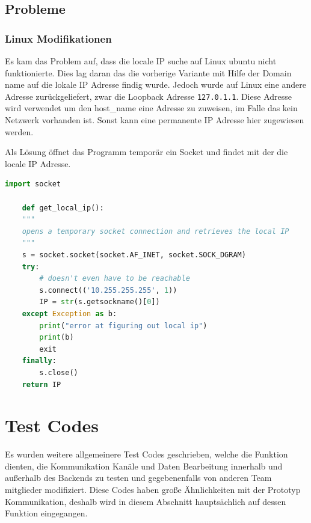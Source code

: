 \subsection{Probleme}
\subsubsection{Linux Modifikationen}
Es kam das Problem auf, dass die locale IP suche auf Linux ubuntu nicht funktionierte.
Dies lag daran das die vorherige Variante 
mit Hilfe der Domain name auf die lokale IP Adresse findig wurde.
Jedoch wurde auf Linux eine andere Adresse zurückgeliefert, 
zwar die Loopback Adresse \texttt{127.0.1.1}. 
Diese Adresse wird verwendet um den host\_name eine Adresse zu zuweisen,
im Falle das kein Netzwerk vorhanden ist. 
Sonst kann eine permanente IP Adresse hier zugewiesen werden.

Als Lösung öffnet das Programm temporär ein Socket und findet mit der die locale IP Adresse.
\begin{lstlisting}[language=python, gobble=4]
    import socket

    def get_local_ip():
    """
    opens a temporary socket connection and retrieves the local IP
    """
    s = socket.socket(socket.AF_INET, socket.SOCK_DGRAM)
    try:
        # doesn't even have to be reachable
        s.connect(('10.255.255.255', 1))
        IP = str(s.getsockname()[0])
    except Exception as b:
        print("error at figuring out local ip")
        print(b)
        exit
    finally:
        s.close()
    return IP
\end{lstlisting}

\section{Test Codes}
Es wurden weitere allgemeinere Test Codes geschrieben, 
welche die Funktion dienten, die Kommunikation Kanäle und Daten Bearbeitung innerhalb 
und außerhalb des Backends zu testen und gegebenenfalls von anderen Team mitglieder modifiziert.
Diese Codes haben große Ähnlichkeiten mit der Prototyp Kommunikation, 
deshalb wird in diesem Abschnitt hauptsächlich auf dessen Funktion eingegangen.